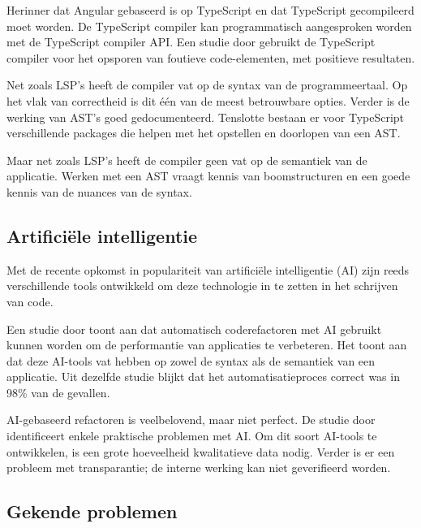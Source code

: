 Herinner dat Angular gebaseerd is op TypeScript en dat TypeScript gecompileerd moet worden.
De TypeScript compiler kan programmatisch aangesproken worden met de TypeScript compiler API.
Een studie door \textcite{Reid2023} gebruikt de TypeScript compiler voor het opsporen van foutieve code-elementen, met positieve resultaten.

Net zoals LSP's heeft de compiler vat op de syntax van de programmeertaal.
Op het vlak van correctheid is dit één van de meest betrouwbare opties.
Verder is de werking van AST's goed gedocumenteerd.
Tenslotte bestaan er voor TypeScript verschillende packages die helpen met het opstellen en doorlopen van een AST.

Maar net zoals LSP's heeft de compiler geen vat op de semantiek van de applicatie.
Werken met een AST vraagt kennis van boomstructuren en een goede kennis van de nuances van de syntax.

\subsection{Artificiële intelligentie}
\label{ch:stand-van-zaken:refactoring:ai}

Met de recente opkomst in populariteit van artificiële intelligentie (AI) zijn reeds verschillende tools ontwikkeld om deze technologie in te zetten in het schrijven van code.

Een studie door \textcite{Poluai2025} toont aan dat automatisch coderefactoren met AI gebruikt kunnen worden om de performantie van applicaties te verbeteren.
Het toont aan dat deze AI-tools vat hebben op zowel de syntax als de semantiek van een applicatie.
Uit dezelfde studie blijkt dat het automatisatieproces correct was in 98\% van de gevallen.

AI-gebaseerd refactoren is veelbelovend, maar niet perfect.
De studie door \textcite{Hodovychenko2025} identificeert enkele praktische problemen met AI.
Om dit soort AI-tools te ontwikkelen, is een grote hoeveelheid kwalitatieve data nodig.
Verder is er een probleem met transparantie; de interne werking kan niet geverifieerd worden.

\subsection{Gekende problemen}
\label{ch:stand-van-zaken:refactoring:known-problems}

